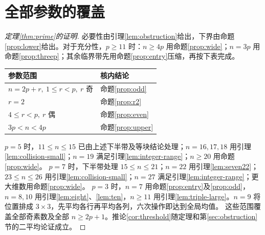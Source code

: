 \documentclass[11pt,a4paper]{article}
\theoremstyle{definition}
\numberwithin{equation}{section}
\begin{document}
\section{全部参数的覆盖}\label{sec:completion}
\begin{proof}[定理\ref{thm:prime}的证明]
必要性由引理\ref{lem:obstruction}给出，下界由命题\ref{prop:lower}给出。对于充分性，$p\ge11$ 时：$n\ge4p$ 用命题\ref{prop:wide}；$n=3p$ 用命题\ref{prop:threep}；其余临界带先用命题\ref{prop:entry}压缩，再按下表完成。
\begin{center}
\begin{tabular}{ll}
\toprule 参数范围 & 核内结论\\\midrule
$n=2p+r,\ 1\le r<p,\ r$ 奇 & 命题\ref{prop:odd}\\
$r=2$ & 命题\ref{prop:r2}\\
$4\le r<p,\ r$ 偶 & 命题\ref{prop:even}\\
$3p<n<4p$ & 命题\ref{prop:upper}\\\bottomrule
\end{tabular}
\end{center}
$p=5$ 时，$11\le n\le15$ 已由上述下半带及等块结论处理；$n=16,17,18$ 用引理\ref{lem:collision-small}；$n=19$ 满足引理\ref{lem:integer-range}；$n\ge20$ 用命题\ref{prop:wide}。
$p=7$ 时，下半带处理 $15\le n\le21$；$n=22$ 用引理\ref{lem:seven22}；$23\le n\le26$ 用引理\ref{lem:collision-small}；$n=27$ 满足引理\ref{lem:integer-range}；更大维数用命题\ref{prop:wide}。
$p=3$ 时，$n=7$ 用命题\ref{prop:entry}及\ref{prop:odd}，$n=8,10$ 用引理\ref{lem:eight}、\ref{lem:ten}，$n\ge11$ 用引理\ref{lem:triple-large}。$n=9$ 将位置排成 $3\times3$，先平均各行再平均各列，六次操作即达到全局均值。
这些范围覆盖全部奇素数及全部 $n\ge2p+1$。推论\ref{cor:threshold}随定理和第\ref{sec:obstruction}节的二平均论证成立。
\end{proof}


\appendix
\end{document}
